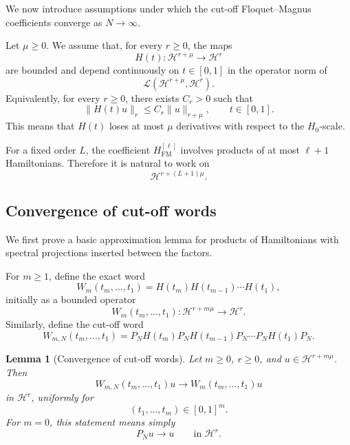 \documentclass[11pt]{amsart}
\theoremstyle{plain}
\newtheorem{lemma}[theorem]{Lemma}
\theoremstyle{definition}
\theoremstyle{remark}
\newcommand{\Hilb}{\mathcal H}
\begin{document}
We now introduce assumptions under which the cut-off
Floquet--Magnus coefficients converge as \(N\to\infty\).

Let \(\mu\geq0\).  We assume that, for every \(r\geq0\), the maps
\[
        H(t):\Hilb^{r+\mu}\longrightarrow \Hilb^r
\]
are bounded and depend continuously on \(t\in[0,1]\) in the operator
norm of
\[
        \mathcal L(\Hilb^{r+\mu},\Hilb^r).
\]
Equivalently, for every \(r\geq0\), there exists \(C_r>0\) such that
\[
        \|H(t)u\|_r
        \leq
        C_r\|u\|_{r+\mu},
        \qquad
        t\in[0,1].
\]
This means that \(H(t)\) loses at most \(\mu\) derivatives with respect
to the \(H_0\)-scale.

For a fixed order \(L\), the coefficient
\(H_{\mathrm{FM}}^{[\ell]}\) involves products of at most
\(\ell+1\) Hamiltonians.  Therefore it is natural to work on
\[
        \Hilb^{r+(L+1)\mu}.
\]

\subsection{Convergence of cut-off words}

We first prove a basic approximation lemma for products of Hamiltonians
with spectral projections inserted between the factors.

For \(m\geq1\), define the exact word
\[
        W_m(t_m,\ldots,t_1)
        =
        H(t_m)H(t_{m-1})\cdots H(t_1),
\]
initially as a bounded operator
\[
        W_m(t_m,\ldots,t_1):
        \Hilb^{r+m\mu}\longrightarrow \Hilb^r.
\]
Similarly, define the cut-off word
\[
        W_{m,N}(t_m,\ldots,t_1)
        =
        P_NH(t_m)P_NH(t_{m-1})P_N\cdots P_NH(t_1)P_N.
\]

\begin{lemma}[Convergence of cut-off words]
\label{lem:word-convergence}
Let \(m\geq0\), \(r\geq0\), and \(u\in \Hilb^{r+m\mu}\).  Then
\[
        W_{m,N}(t_m,\ldots,t_1)u
        \longrightarrow
        W_m(t_m,\ldots,t_1)u
\]
in \(\Hilb^r\), uniformly for
\[
        (t_1,\ldots,t_m)\in[0,1]^m.
\]
For \(m=0\), this statement means simply
\[
        P_Nu\to u
        \qquad\text{in }\Hilb^r.
\]
\end{lemma}
\end{document}
